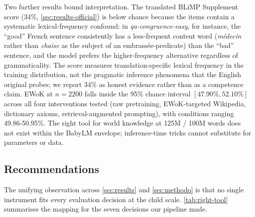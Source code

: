\documentclass[11pt]{article}
\begin{document}
Two further results bound interpretation. The translated BLiMP Supplement score (34\%, \autoref{sec:results-official}) is below chance because the items contain a systematic lexical-frequency confound: in \emph{qa-congruence-easy}, for instance, the \enquote{good} French sentence consistently has a less-frequent content word (\emph{médecin} rather than \emph{chaise} as the subject of an embrassée-predicate) than the \enquote{bad} sentence, and the model prefers the higher-frequency alternative regardless of grammaticality. 
The score measures translation-specific lexical frequency in the training distribution, not the pragmatic inference phenomena that the English original probes; we report 34\% as honest evidence rather than as a competence claim. EWoK at $n\!=\!2200$ falls inside the 95\% chance interval $[47.90\%, 52.10\%]$ across all four interventions tested (raw pretraining, EWoK-targeted Wikipedia, dictionary axioms, retrieval-augmented prompting), with conditions ranging 49.86-50.95\%. The right tool for world knowledge at 125M / 100M words does not exist within the BabyLM envelope; inference-time tricks cannot substitute for parameters or data.

\subsection{Recommendations}
\label{sec:discussion}

The unifying observation across \autoref{sec:results} and \autoref{sec:methodo} is that no single instrument fits every evaluation decision at the child scale. \autoref{tab:right-tool} summarises the mapping for the seven decisions our pipeline made.
\end{document}
